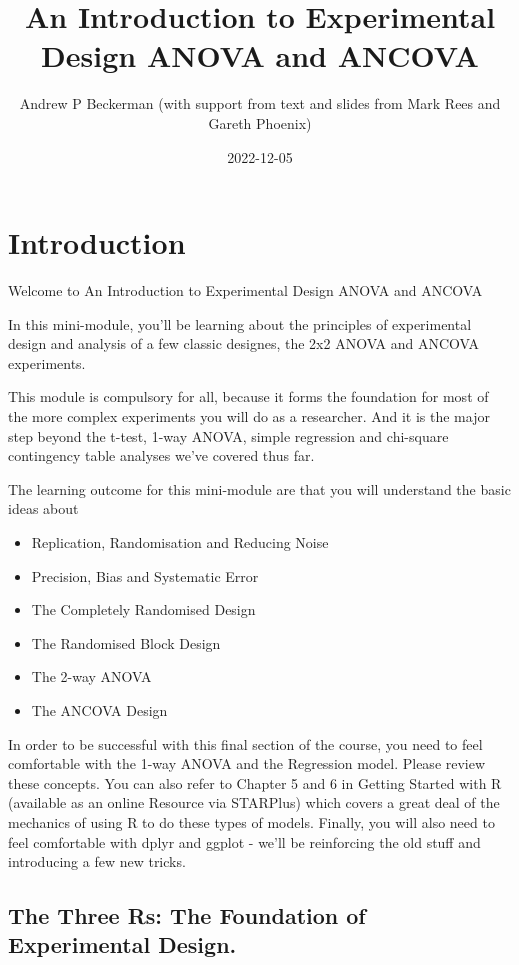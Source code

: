 \documentclass[
]{book}
\title{An Introduction to Experimental Design ANOVA and ANCOVA}
\author{Andrew P Beckerman (with support from text and slides from Mark Rees and Gareth Phoenix)}
\date{2022-12-05}
\providecommand{\tightlist}{%
  \setlength{\itemsep}{0pt}\setlength{\parskip}{0pt}}
\begin{document}
\maketitle

{
\setcounter{tocdepth}{1}
\tableofcontents
}
\hypertarget{introduction}{%
\chapter{Introduction}\label{introduction}}

Welcome to An Introduction to Experimental Design ANOVA and ANCOVA

In this mini-module, you'll be learning about the principles of experimental design and analysis of a few classic designes, the 2x2 ANOVA and ANCOVA experiments.

This module is compulsory for all, because it forms the foundation for most of the more complex experiments you will do as a researcher. And it is the major step beyond the t-test, 1-way ANOVA, simple regression and chi-square contingency table analyses we've covered thus far.

The learning outcome for this mini-module are that you will understand the basic ideas about

\begin{itemize}
\tightlist
\item
  Replication, Randomisation and Reducing Noise
\item
  Precision, Bias and Systematic Error
\item
  The Completely Randomised Design
\item
  The Randomised Block Design
\item
  The 2-way ANOVA
\item
  The ANCOVA Design
\end{itemize}

In order to be successful with this final section of the course, you need to feel comfortable with the 1-way ANOVA and the Regression model. Please review these concepts. You can also refer to Chapter 5 and 6 in Getting Started with R (available as an online Resource via STARPlus) which covers a great deal of the mechanics of using R to do these types of models. Finally, you will also need to feel comfortable with dplyr and ggplot - we'll be reinforcing the old stuff and introducing a few new tricks.

\hypertarget{the-three-rs-the-foundation-of-experimental-design.}{%
\section{The Three Rs: The Foundation of Experimental Design.}\label{the-three-rs-the-foundation-of-experimental-design.}}
\end{document}
